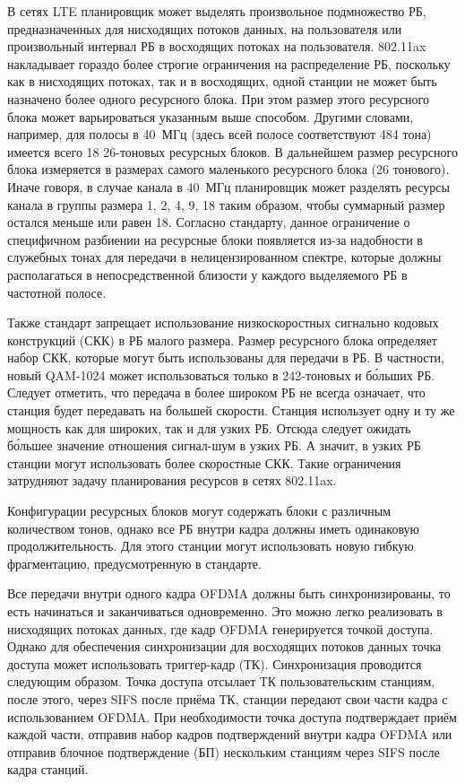 В сетях LTE планировщик может выделять произвольное подмножество РБ, предназначенных для нисходящих потоков данных, на пользователя или произвольный интервал РБ в восходящих потоках на пользователя. 
802.11ax накладывает гораздо более строгие ограничения на распределение РБ, поскольку как в нисходящих потоках, так и в восходящих, одной станции не может быть назначено более одного ресурсного блока. 
При этом размер этого ресурсного блока может варьироваться указанным выше способом. 
Другими словами, например, для полосы в 40~МГц (здесь всей полосе соответствуют 484 тона) имеется всего 18 26-тоновых ресурсных блоков. В дальнейшем размер ресурсного блока измеряется в размерах самого маленького ресурсного блока (26 тонового). Иначе говоря, в случае канала в 40~МГц планировщик может разделять ресурсы канала в группы размера 1, 2, 4, 9, 18 таким образом, чтобы суммарный размер остался меньше или равен 18. Согласно стандарту, данное ограничение о специфичном разбиении на ресурсные блоки появляется из-за надобности в служебных тонах для передачи в нелицензированном спектре, которые должны располагаться в непосредственной близости у каждого выделяемого РБ в частотной полосе.

Также стандарт запрещает использование низкоскоростных сигнально кодовых конструкций (СКК) в РБ малого размера.
Размер ресурсного блока определяет набор СКК, которые могут быть использованы для передачи в РБ. 
В частности, новый QAM-1024 может использоваться только в 242-тоновых и б\'{о}льших РБ.  
Следует отметить, что передача в более широком РБ не всегда означает, что станция будет передавать на большей скорости. 
Станция использует одну и ту же мощность как для широких, так и для узких РБ. 
Отсюда следует ожидать б\'{о}льшее значение отношения сигнал-шум в узких РБ. А значит, в узких РБ станции могут использовать более скоростные СКК. 
Такие ограничения затрудняют задачу планирования ресурсов в сетях 802.11ax. 

Конфигурации ресурсных блоков могут содержать блоки с различным количеством тонов, однако все РБ внутри кадра должны иметь одинаковую продолжительность. Для этого станции могут использовать новую гибкую фрагментацию, предусмотренную в стандарте.

Все передачи внутри одного кадра OFDMA должны быть синхронизированы, то есть начинаться и заканчиваться одновременно. Это можно легко реализовать в нисходящих потоках данных, где кадр OFDMA генерируется точкой доступа. Однако для обеспечения синхронизации для восходящих потоков данных точка доступа может использовать триггер-кадр (ТК). Синхронизация проводится следующим образом. Точка доступа отсылает ТК пользовательским станциям, после этого, через SIFS после приёма ТК, станции передают свои части кадра с использованием OFDMA. При необходимости точка доступа подтверждает приём каждой части, отправив набор кадров подтверждений внутри кадра OFDMA или отправив блочное подтверждение (БП) нескольким станциям через SIFS после кадра станций.

